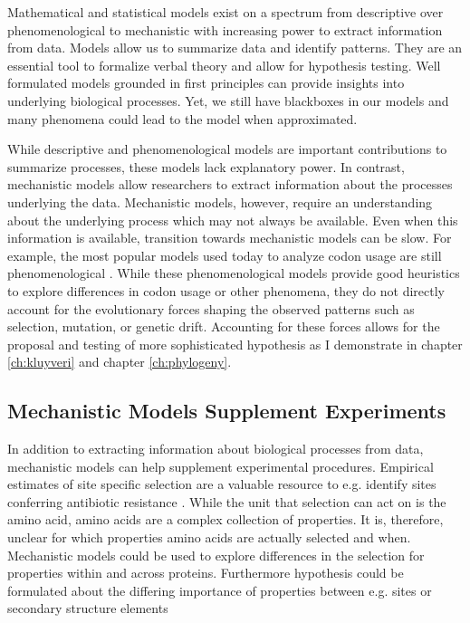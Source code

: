 Mathematical and statistical models exist on a spectrum from descriptive over phenomenological to mechanistic with increasing power to extract information from data.
Models allow us to summarize data and identify patterns.
They are an essential tool to formalize verbal theory and allow for hypothesis testing.
Well formulated models grounded in first principles can provide insights into underlying biological processes.
Yet, we still have blackboxes in our models and many phenomena could lead to the model when approximated.

While descriptive and phenomenological models are important contributions to summarize processes, these models lack explanatory power.
In contrast, mechanistic models allow researchers to extract information about the processes underlying the data.
Mechanistic models, however, require an understanding about the underlying process which may not always be available.
Even when this information is available, transition towards mechanistic models can be slow.
For example, the most popular models used today to analyze codon usage are still phenomenological \citep{ikemura1981,BennetzenAndHall1982,sharp1987,Wright1990,dosreis2003,dosreis2004}.
While these phenomenological models provide good heuristics to explore differences in codon usage or other phenomena, they do not directly account for the evolutionary forces shaping the observed patterns such as selection, mutation, or genetic drift.
Accounting for these forces allows for the proposal and testing of more sophisticated hypothesis as I demonstrate in chapter \ref{ch:kluyveri} and chapter \ref{ch:phylogeny}.

\subsection{Mechanistic Models Supplement Experiments}

In addition to extracting information about biological processes from data, mechanistic models can help supplement experimental procedures.
Empirical estimates of site specific selection are a valuable resource to e.g. identify sites conferring antibiotic resistance \citep{firnberg2014, stiffler2016}.
While the unit that selection can act on is the amino acid, amino acids are a complex collection of \PC properties.
It is, therefore, unclear for which properties amino acids are actually selected and when.
Mechanistic models could be used to explore differences in the selection for \PC properties within and across proteins.
Furthermore hypothesis could be formulated about the differing importance of \PC properties between e.g. sites or secondary structure elements

